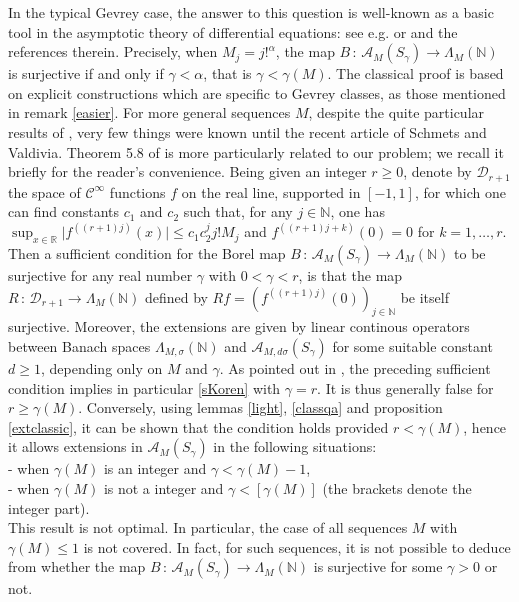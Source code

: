 \documentclass[a4paper]{amsart}
\theoremstyle{plain}
\theoremstyle{definition}
\theoremstyle{remark}
\begin{document}
In the typical 
Gevrey case, the answer to this question
is well-known as a basic tool in the asymptotic theory of differential equations: see e.g. \cite{Ra} or \cite{Touglectures} and
the references therein. Precisely, when $ M_j=j!^\alpha $, the map $ B\, :\, \mathcal{A}_M(S_\gamma)\longrightarrow \Lambda_M(\mathbb{N}) $ is surjective if and only if $ \gamma<\alpha $, that is
$ \gamma<\gamma(M) $. The classical proof is based on explicit constructions which are specific to Gevrey classes, as those mentioned in remark \ref{easier}. For more general
sequences $ M $, despite the quite particular results of \cite{BrakImm}, very few things were known until the recent article \cite{SV} of Schmets and Valdivia. Theorem 5.8 of
\cite{SV} is more particularly related to our problem; we recall it briefly for the reader's convenience. Being given an integer $ r\geq 0 $, denote by 
$ \mathcal{D}_{r+1} $ the space of $ \mathcal{C}^\infty $ functions $ f $ on the real line, supported in $ [-1,1] $, for which one can find constants $ c_1 $ and $ c_2 $ such that, for any $ j\in\mathbb{N} $, one has
$ \sup_{x\in\mathbb{R}}\vert f^{((r+1)j)}(x)\vert\leq c_1c_2^jj!M_j $ and $ f^{((r+1)j+k)}(0)=0 $ for $ k=1,\ldots,r $. Then a sufficient condition for the Borel map $ B\, :\, \mathcal{A}_M(S_\gamma)\longrightarrow\Lambda_M(\mathbb{N}) $ to be surjective for any real number $ \gamma $ with $ 0<\gamma<r $, is that the map
$ R\, :\, \mathcal{D}_{r+1}\longrightarrow\Lambda_M(\mathbb{N}) $ defined by
$ Rf=(f^{((r+1)j)}(0))_{j\in\mathbb{N}} $ be itself surjective. 
Moreover, the extensions are given by linear continous operators between Banach spaces
$ \Lambda_{M,\sigma}(\mathbb{N}) $ and $ \mathcal{A}_{M,d\sigma}(S_\gamma) $ for some suitable constant $ d\geq 1 $, depending only on $ M $ and $ \gamma $. As pointed out in \cite{SV}, the preceding sufficient condition implies in particular \eqref{sKoren} with $ \gamma=r $. It is thus generally false for $ r\geq\gamma(M) $. Conversely, using lemmas \ref{light}, \ref{classqa} and proposition \ref{extclassic}, it can be shown that the condition holds provided
$ r<\gamma(M) $, hence it allows extensions in $ \mathcal{A}_M(S_\gamma) $ in the following situations:\\
- when $ \gamma(M) $ is an integer and $ \gamma<\gamma(M)-1 $,\\
- when $ \gamma(M) $ is not a integer and $ \gamma<[\gamma(M)] $ (the
brackets denote the integer part).\\ 
This result is not optimal. In particular, the case of all sequences 
$ M $ with $ \gamma(M)\leq 1 $ is not covered. In fact, for such sequences, it is not possible to deduce from \cite{SV} whether the map $ B\, :\, \mathcal{A}_M(S_\gamma)\longrightarrow \Lambda_M(\mathbb{N}) $ is surjective for some $ \gamma>0 $ or not.
\end{document}
